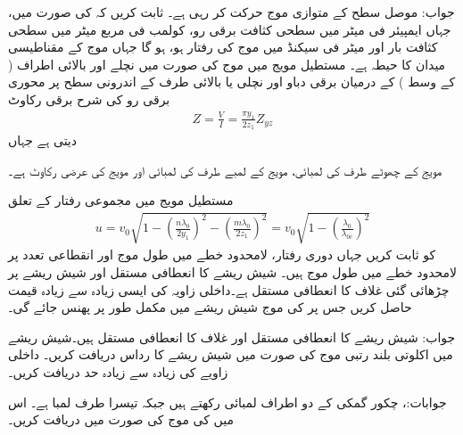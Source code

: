 جواب: 
موصل سطح کے متوازی  موج حرکت کر رہی ہے۔ ثابت کریں کہ  کی صورت میں، جہاں  ایمپیئر فی میٹر میں سطحی کثافت برقی رو،  کولمب فی مربع میٹر میں سطحی کثافت بار اور  میٹر فی سیکنڈ میں موج کی رفتار ہو،  ہو گا جہاں  موج کے مقناطیسی میدان  کا حیطہ ہے۔
مستطیل مویج میں  موج کی صورت میں نچلے اور بالائی اطراف ( کے وسط ) کے درمیان برقی دباو  اور نچلی یا بالائی طرف کے اندرونی سطح پر محوری برقی رو  کی شرح برقی رکاوٹ  
\begin{align}
Z=\frac{V}{I}=\frac{\pi y_1}{2 z_1} Z_{yz}
\end{align}
دیتی ہے جہاں
\begin{description}
 مویج کے چھوٹے طرف کی لمبائی،
 مویج کے لمبے طرف کی لمبائی اور
 مویج کی عرضی رکاوٹ ہے۔
\end{description}
مستطیل مویج میں مجموعی رفتار  کے تعلق
\begin{align}
u=v_0 \sqrt{1-\left(\frac{n \lambda_0}{2 y_1}\right)^2-\left(\frac{m \lambda_0}{2 z_1}\right)^2}=v_0 \sqrt{1-\left(\frac{\lambda_0}{\lambda_{0c}}\right)^2}
\end{align}
کو ثابت کریں جہاں  دوری رفتار،  لامحدود خطے میں طول موج اور  انقطاعی تعدد پر لامحدود خطے میں طول موج ہیں۔
شیش ریشے کا  انعطافی مستقل  اور شیش ریشے پر چڑھائی گئی غلاف کا  انعطافی مستقل  ہے۔داخلی زاویہ  کی ایسی زیادہ سے زیادہ قیمت حاصل کریں جس پر  کی موج شیش ریشے میں مکمل طور پر پھنس جائے گی۔

جواب: 
شیش ریشے کا  انعطافی مستقل  اور غلاف کا  انعطافی مستقل  ہیں۔شیش ریشے میں اکلوتی  بلند رتبی موج کی صورت میں شیش ریشے کا رداس دریافت کریں۔ داخلی زاویے کی زیادہ سے زیادہ حد دریافت کریں۔

جوابات:، 
چکور گمکی کے دو اطراف  لمبائی رکھتے ہیں جبکہ تیسرا طرف  لمبا ہے۔ اس میں  کی  موج کی صورت میں  دریافت کریں۔

